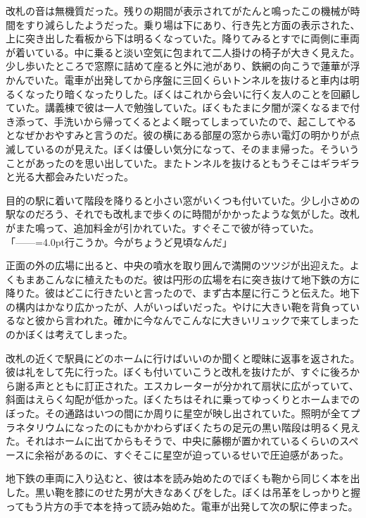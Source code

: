 \documentclass[b5j,twoside,twocolumn]{utarticle}
\begin{document}
改札の音は無機質だった。残りの期間が表示されてがたんと鳴ったこの機械が時間をすり減らしたようだった。乗り場は下にあり、行き先と方面の表示された、上に突き出した看板から下は明るくなっていた。降りてみるとすでに両側に車両が着いている。中に乗ると淡い空気に包まれて二人掛けの椅子が大きく見えた。少し歩いたところで窓際に詰めて座ると外に池があり、鉄網の向こうで蓮華が浮かんでいた。電車が出発してから序盤に三回くらいトンネルを抜けると車内は明るくなったり暗くなったりした。ぼくはこれから会いに行く友人のことを回顧していた。講義棟で彼は一人で勉強していた。ぼくもたまに夕闇が深くなるまで付き添って、手洗いから帰ってくるとよく眠ってしまっていたので、起こしてやるとなぜかおやすみと言うのだ。彼の横にある部屋の窓から赤い電灯の明かりが点滅しているのが見えた。ぼくは優しい気分になって、そのまま帰った。そういうことがあったのを思い出していた。またトンネルを抜けるともうそこはギラギラと光る大都会みたいだった。


目的の駅に着いて階段を降りると小さい窓がいくつも付いていた。少し小さめの駅なのだろう、それでも改札まで歩くのに時間がかかったような気がした。改札がまた鳴って、追加料金が引かれていた。すぐそこで彼が待っていた。\\
「\tbaselineshift=2.5pt------\tbaselineshift=4.0pt行こうか。今がちょうど見頃なんだ」


正面の外の広場に出ると、中央の噴水を取り囲んで満開のツツジが出迎えた。よくもまあこんなに植えたものだ。彼は円形の広場を右に突き抜けて地下鉄の方に降りた。彼はどこに行きたいと言ったので、まず古本屋に行こうと伝えた。地下の構内はかなり広かったが、人がいっぱいだった。やけに大きい鞄を背負っているなと彼から言われた。確かに今なんでこんなに大きいリュックで来てしまったのかぼくは考えてしまった。


改札の近くで駅員にどのホームに行けばいいのか聞くと曖昧に返事を返された。彼は礼をして先に行った。ぼくも付いていこうと改札を抜けたが、すぐに後ろから謝る声とともに訂正された。エスカレーターが分かれて扇状に広がっていて、斜面はえらく勾配が低かった。ぼくたちはそれに乗ってゆっくりとホームまでのぼった。その通路はいつの間にか周りに星空が映し出されていた。照明が全てプラネタリウムになったのにもかかわらずぼくたちの足元の黒い階段は明るく見えた。それはホームに出てからもそうで、中央に藤棚が置かれているくらいのスペースに余裕があるのに、すぐそこに星空が迫っているせいで圧迫感があった。


地下鉄の車両に入り込むと、彼は本を読み始めたのでぼくも鞄から同じく本を出した。黒い鞄を膝にのせた男が大きなあくびをした。ぼくは吊革をしっかりと握ってもう片方の手で本を持って読み始めた。電車が出発して次の駅に停まった。
\end{document}
